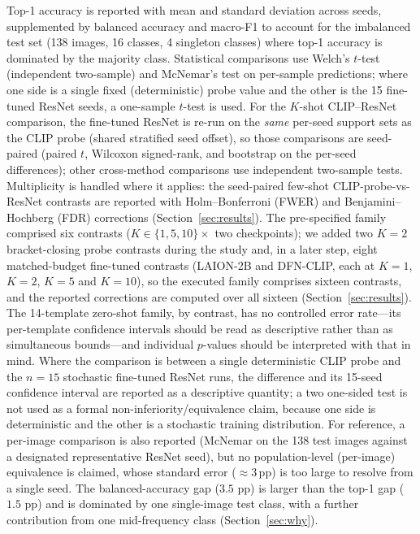 \documentclass[10pt,a4paper]{article}
\begin{document}
Top-1 accuracy is reported with mean and standard deviation across seeds, supplemented by balanced accuracy and macro-F1 to account for the imbalanced test set (138 images, 16 classes, 4 singleton classes) where top-1 accuracy is dominated by the majority class.
Statistical comparisons use Welch's $t$-test (independent two-sample) and McNemar's test on per-sample predictions; where one side is a single fixed (deterministic) probe value and the other is the 15 fine-tuned ResNet seeds, a one-sample $t$-test is used. For the $K$-shot CLIP--ResNet comparison, the fine-tuned ResNet is re-run on the \emph{same} per-seed support sets as the CLIP probe (shared stratified seed offset), so those comparisons are seed-paired (paired $t$, Wilcoxon signed-rank, and bootstrap on the per-seed differences); other cross-method comparisons use independent two-sample tests. Multiplicity is handled where it applies: the seed-paired few-shot CLIP-probe-vs-ResNet contrasts are reported with Holm--Bonferroni (FWER) and Benjamini--Hochberg (FDR) corrections (Section~\ref{sec:results}). The pre-specified family comprised six contrasts ($K\in\{1,5,10\}\times$ two checkpoints); we added two $K{=}2$ bracket-closing probe contrasts during the study and, in a later step, eight matched-budget fine-tuned contrasts (LAION-2B and DFN-CLIP, each at $K{=}1$, $K{=}2$, $K{=}5$ and $K{=}10$), so the executed family comprises sixteen contrasts, and the reported corrections are computed over all sixteen (Section~\ref{sec:results}). The 14-template zero-shot family, by contrast, has no controlled error rate---its per-template confidence intervals should be read as descriptive rather than as simultaneous bounds---and individual $p$-values should be interpreted with that in mind.
Where the comparison is between a single deterministic CLIP probe and the $n{=}15$ stochastic fine-tuned ResNet runs, the difference and its 15-seed confidence interval are reported as a descriptive quantity; a two one-sided test is not used as a formal non-inferiority/equivalence claim, because one side is deterministic and the other is a stochastic training distribution. For reference, a per-image comparison is also reported (McNemar on the 138 test images against a designated representative ResNet seed), but no population-level (per-image) equivalence is claimed, whose standard error ($\approx$3\,pp) is too large to resolve from a single seed. The balanced-accuracy gap ($3.5$ pp) is larger than the top-1 gap ($1.5$ pp) and is dominated by one single-image test class, with a further contribution from one mid-frequency class (Section~\ref{sec:why}).
\end{document}
